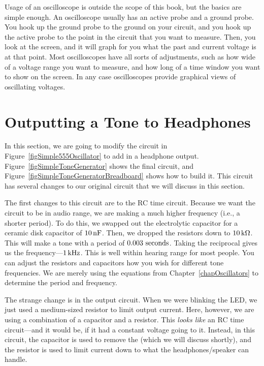 Usage of an oscilloscope is outside the scope of this book, but the basics are simple enough.
An oscilloscope usually has an active probe and a ground probe.
You hook up the ground probe to the ground on your circuit, and you hook up the active probe to the point in the circuit that you want to measure.
Then, you look at the screen, and it will graph for you what the past and current voltage is at that point.
Most oscilloscopes have all sorts of adjustments, such as how wide of a voltage range you want to measure, and how long of a time window you want to show on the screen.
In any case oscilloscopes provide graphical views of oscillating voltages.

\section{Outputting a Tone to Headphones}

In this section, we are going to modify the circuit in Figure~\ref{figSimple555Oscillator} to add in a headphone output.
Figure~\ref{figSimpleToneGenerator} shows the final circuit, and Figure~\ref{figSimpleToneGeneratorBreadboard} shows how to build it.
This circuit has several changes to our original circuit that we will discuss in this section.



The first changes to this circuit are to the RC time circuit.
Because we want the circuit to be in audio range, we are making a much higher frequency (i.e., a shorter period).
To do this, we swapped out the electrolytic capacitor for a ceramic disk capacitor of $10\,\si{\nano\farad}$.  
Then, we dropped the resistors down to $10\,\si{\kilo\ohm}$.
This will make a tone with a period of $0.003\textrm{ seconds}$.
Taking the reciprocal gives us the frequency---$1\,\si{\kilo\hertz}$.
This is well within hearing range for most people.
You can adjust the resistors and capacitors how you wish for different tone frequencies.
We are merely using the equations from Chapter~\ref{chapOscillators} to determine the period and frequency.

The strange change is in the output circuit.
When we were blinking the LED, we just used a medium-sized resistor to limit output current.
Here, however, we are using a combination of a capacitor and a resistor.
This \emph{looks like} an RC time circuit---and it would be, if it had a constant voltage going to it.
Instead, in this circuit, the capacitor is used to remove the  (which we will discuss shortly), and the resistor is used to limit current down to what the headphones/speaker can handle.


